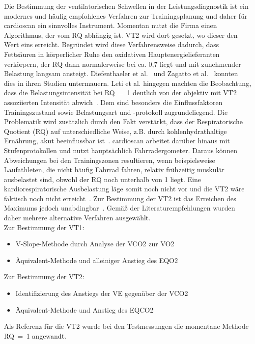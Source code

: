 Die Bestimmung der ventilatorischen Schwellen in der Leistungsdiagnostik ist ein modernes und häufig empfohlenes Verfahren zur Trainingsplanung und daher für cardioscan ein sinnvolles Instrument. Momentan nutzt die Firma einen Algorithmus, der vom RQ abhängig ist. VT2 wird dort gesetzt, wo dieser den Wert eins erreicht. Begründet wird diese Verfahrensweise dadurch, dass Fettsäuren in körperlicher Ruhe den oxidativen Hauptenergielieferanten verkörpern, der RQ dann normalerweise bei ca. 0,7 liegt und mit zunehmender Belastung langsam ansteigt. Diefenthaeler et al.~\cite{Diefenthaeler.2017} und Zagatto et al.~\cite{Zagatto.2012} konnten dies in ihren Studien untermauern. Leti et al. hingegen machten die Beobachtung, dass die Belastungsintensität bei RQ~=~1 deutlich von der objektiv mit VT2 assoziierten Intensität abwich~\cite{Leti.2012}. Dem sind besonders die Einflussfaktoren Trainingszustand sowie Belastungsart und -protokoll zugrundeliegend. Die Problematik wird zusätzlich durch den Fakt verstärkt, dass der Respiratorische Quotient (\acs{RQ}) auf unterschiedliche Weise, z.B. durch kohlenhydrathaltige Ernährung, akut beeinflussbar ist~\cite{ScharhagRosenberger.2010}. cardioscan arbeitet darüber hinaus mit Stufenprotokollen und nutzt hauptsächlich Fahrradergometer. Daraus können Abweichungen bei den Trainingszonen resultieren, wenn beispielsweise Laufathleten, die nicht häufig Fahrrad fahren, relativ frühzeitig muskulär ausbelastet sind, obwohl der RQ noch unterhalb von 1 liegt. Eine kardiorespiratorische Ausbelastung läge somit noch nicht vor und die VT2 wäre faktisch noch nicht erreicht~\cite{Tzvetkov.2008}. Zur Bestimmung der VT2 ist das Erreichen des Maximums jedoch unabdingbar~\cite{ScharhagRosenberger.2013}. Gemäß der Literaturempfehlungen wurden daher mehrere alternative Verfahren ausgewählt.\\
Zur Bestimmung der VT1:
%
\begin{itemize}
	\item V-Slope-Methode durch Analyse der \acs{VCO2} zur \acs{VO2}
	\item Äquivalent-Methode und alleiniger Anstieg des \acs{EQO2}
\end{itemize}
%
Zur Bestimmung der VT2:
%
\begin{itemize}
	\item Identifizierung des Anstiegs der \acs{VE} gegenüber der \acs{VCO2}
	\item Äquivalent-Methode und Anstieg des \acs{EQCO2}
\end{itemize}
%
Als Referenz für die VT2 wurde bei den Testmessungen die momentane Methode RQ~=~1 angewandt.\\
